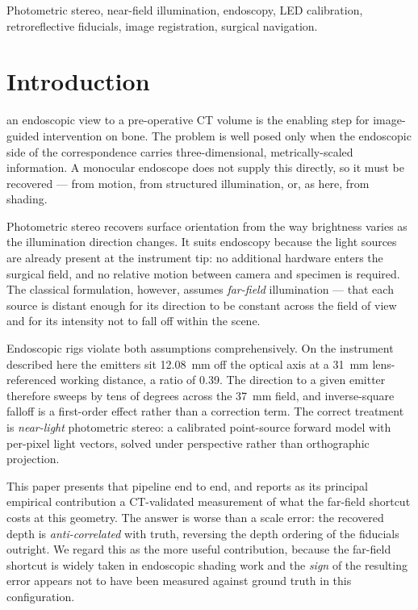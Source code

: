 \documentclass[journal,10pt]{IEEEtran}
\begin{document}
\begin{IEEEkeywords}
Photometric stereo, near-field illumination, endoscopy, LED calibration,
retroreflective fiducials, image registration, surgical navigation.
\end{IEEEkeywords}

\section{Introduction}
 an endoscopic view to a pre-operative CT volume is
the enabling step for image-guided intervention on bone. The problem is well
posed only when the endoscopic side of the correspondence carries
three-dimensional, metrically-scaled information. A monocular endoscope does not
supply this directly, so it must be recovered --- from motion, from structured
illumination, or, as here, from shading.

Photometric stereo recovers surface orientation from the way brightness varies
as the illumination direction changes. It suits endoscopy because the light
sources are already present at the instrument tip: no additional hardware enters
the surgical field, and no relative motion between camera and specimen is
required. The classical formulation, however, assumes \emph{far-field}
illumination --- that each source is distant enough for its direction to be
constant across the field of view and for its intensity not to fall off within
the scene.

Endoscopic rigs violate both assumptions comprehensively. On the instrument
described here the emitters sit \SI{12.08}{\milli\metre} off the optical axis at
a \SI{31}{\milli\metre} lens-referenced working distance, a ratio of
\num{0.39}. The direction
to a given emitter therefore sweeps by tens of degrees across the
\SI{37}{\milli\metre} field, and inverse-square falloff is a first-order effect
rather than a correction term. The correct treatment is \emph{near-light}
photometric stereo: a calibrated point-source forward model with per-pixel light
vectors, solved under perspective rather than orthographic projection.

This paper presents that pipeline end to end, and reports as its principal
empirical contribution a CT-validated measurement of what the far-field
shortcut costs at this geometry. The answer is worse than a scale error: the
recovered depth is \emph{anti-correlated} with truth, reversing the depth
ordering of the fiducials outright. We regard this as the more useful
contribution, because the far-field shortcut is widely taken in endoscopic
shading work and the \emph{sign} of the resulting error appears not to have been
measured against ground truth in this configuration.
\end{document}

